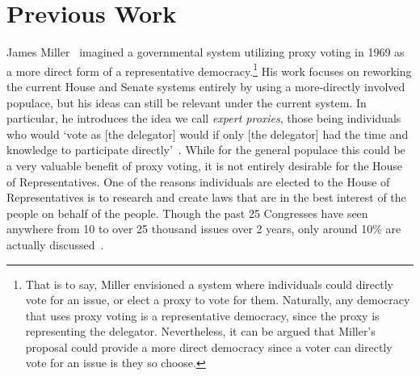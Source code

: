 \section{Previous Work}\label{sec:previous-work}
James Miller~\cite{Miller1969} imagined a governmental system utilizing proxy voting
 in 1969 as a more direct form of a representative democracy.\footnote{
    That is to say, Miller envisioned a system where individuals could directly vote
    for an issue, or elect a proxy to vote for them.
    Naturally, any democracy that uses proxy voting is a representative democracy,
    since the proxy is representing the delegator.
    Nevertheless, it can be argued that Miller's proposal could provide a more direct
    democracy since a voter can directly vote for an issue is they so choose.
}
His work focuses on reworking the current House and Senate systems entirely by using a
more-directly involved populace, but his ideas can still be relevant under the current
system.
In particular, he introduces the idea we call \textit{expert proxies},
those being individuals who would `vote as [the delegator] would if only
[the delegator] had the time and knowledge to participate directly'~\cite{Miller1969}.
While for the general populace this could be a very valuable benefit of proxy voting,
it is not entirely desirable for the House of Representatives.
One of the reasons individuals are elected to the House of Representatives is to
research and create laws that are in the best interest of the people on behalf of
the people.
Though the past 25 Congresses have seen anywhere from 10 to over 25 thousand issues
over 2 years, only around 10\% are actually discussed~\cite{GovTrack2022}.
